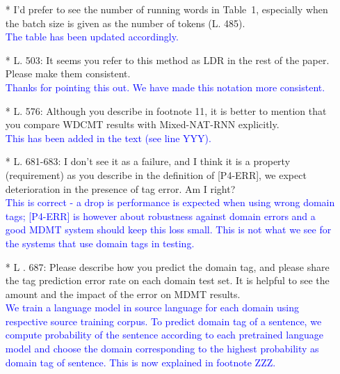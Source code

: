 \documentclass[12pt,times,a4paper,twoside]{article}
\newcommand{\fyTodo}[1]{\Todo[FY:]{\textcolor{orange}{#1}}}
\theoremstyle{definition}
\begin{document}
\begin{itemize}
\\
\item[*] I’d prefer to see the number of running words in Table~1, especially when the batch size is given as the number of tokens (L. 485).
  \\
  \textcolor{blue}{The table has been updated accordingly.}\fyTodo{to report number of tokens of the datasets}
\\
\item[*] L. 503: It seems you refer to this method as LDR in the rest of the paper. Please make them consistent.
\\
\textcolor{blue}{Thanks for pointing this out. We have made this notation more consistent.}
\\
\item[*] L. 576: Although you describe in footnote 11, it is better to mention that you compare WDCMT results with Mixed-NAT-RNN explicitly.
\\
\textcolor{blue}{This has been added in the text (see line YYY).}\fyTodo{to explicitly compare WDCNMT with Mixed-NAT-RNN. This is in the legend - change presentations ?}
\\
\item[*] L. 681-683: I don’t see it as a failure, and I think it is a property (requirement) as you describe in the definition of [P4-ERR], we expect deterioration in the presence of tag error. Am I right?
\\
\textcolor{blue}{This is correct - a drop is performance is expected when using wrong domain tags; [P4-ERR] is however about robustness against domain errors and a good MDMT system should keep this loss small. This is not what we see for the systems that use domain tags in testing.}

\item[* L]. 687: Please describe how you predict the domain tag, and please share the tag prediction error rate on each domain test set. It is helpful to see the amount and the impact of the error on MDMT results.
\\
\textcolor{blue}{We train a language model in source language for each domain using respective source training corpus. To predict domain tag of a sentence, we compute probability of the sentence according to each pretrained language model and choose the domain corresponding to the highest probability as domain tag of sentence. This is now explained in footnote ZZZ.}\fyTodo{to compute error rate of domain prediction over each test set, check comment, add footnote number.}
\end{itemize}
\end{document}
